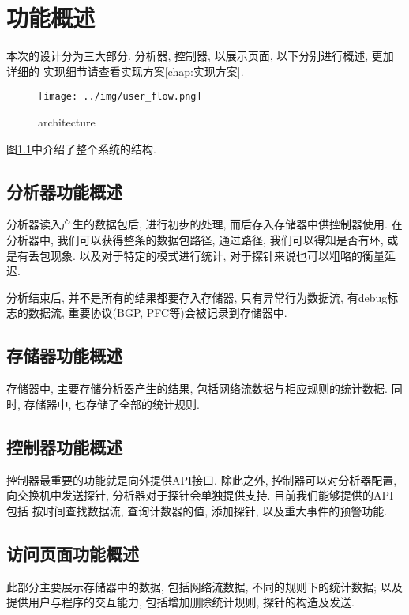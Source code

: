 \chapter{功能概述}

本次的设计分为三大部分. 分析器, 控制器, 以展示页面, 以下分别进行概述,
更加详细的 实现细节请查看实现方案\ref{chap:实现方案}.

\begin{figure}
  \centering
  \texttt{[image: ../img/user\_flow.png]}
  \caption{architecture}
  \label{fig:arch}
\end{figure}

图\ref{fig:arch}中介绍了整个系统的结构.

\section{分析器功能概述}

分析器读入产生的数据包后, 进行初步的处理, 而后存入存储器中供控制器使用.
在分析器中, 我们可以获得整条的数据包路径, 通过路径,
我们可以得知是否有环, 或是有丢包现象. 以及对于特定的模式进行统计,
对于探针来说也可以粗略的衡量延迟.

分析结束后, 并不是所有的结果都要存入存储器, 只有异常行为数据流,
有debug标志的数据流, 重要协议(BGP, PFC等)会被记录到存储器中.

\section{存储器功能概述}

存储器中, 主要存储分析器产生的结果, 包括网络流数据与相应规则的统计数据.
同时, 存储器中, 也存储了全部的统计规则.

\section{控制器功能概述}

控制器最重要的功能就是向外提供API接口. 除此之外, 控制器可以对分析器配置,
向交换机中发送探针, 分析器对于探针会单独提供支持.
目前我们能够提供的API包括 按时间查找数据流, 查询计数器的值, 添加探针,
以及重大事件的预警功能.

\section{访问页面功能概述}

此部分主要展示存储器中的数据, 包括网络流数据, 不同的规则下的统计数据;
以及提供用户与程序的交互能力, 包括增加删除统计规则, 探针的构造及发送.

